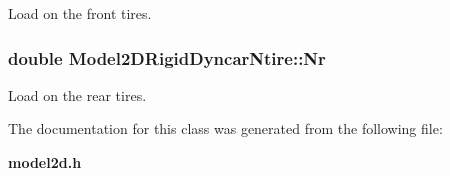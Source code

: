 Load on the front tires.

\subsubsection{\setlength{\rightskip}{0pt plus 5cm}double Model2DRigid\-Dyncar\-Ntire::Nr}\label{class_Model2DRigidDyncarNtire_m2}


Load on the rear tires.



The documentation for this class was generated from the following file:\begin{CompactItemize}
\item 
{\bf model2d.h}\end{CompactItemize}
